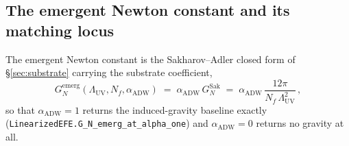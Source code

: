 \documentclass[aps,prd,nofootinbib,superscriptaddress,12pt]{revtex4-2}
\DeclareRobustCommand{\lb}{\discretionary{}{}{}}
\begin{document}
\subsection{The emergent Newton constant and its matching locus}
\label{sec:efe-newton}

The emergent Newton constant is the Sakharov--Adler closed form of
\S\ref{sec:substrate} carrying the substrate coefficient,
\begin{equation}
\label{eq:g-n-emerg}
G_N^{\mathrm{emerg}}(\Lambda_{\mathrm{UV}}, N_f, \alpha_{\mathrm{ADW}})
\;=\; \alpha_{\mathrm{ADW}}\, G_N^{\mathrm{Sak}}
\;=\; \alpha_{\mathrm{ADW}}\,\frac{12\pi}{N_f\,\Lambda_{\mathrm{UV}}^{2}}\,,
\end{equation}
so that $\alpha_{\mathrm{ADW}} = 1$ returns the induced-gravity baseline exactly
(\texttt{Linearized\lb{}EFE.\lb{}G\_\lb{}N\_\lb{}emerg\_\lb{}at\_\lb{}alpha\_\lb{}one}) and
$\alpha_{\mathrm{ADW}} = 0$ returns no gravity at all.
\end{document}
